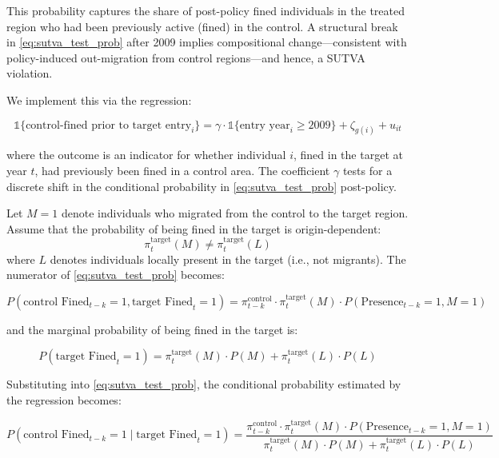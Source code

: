 \documentclass[12pt]{article}
\begin{document}
\noindent This probability captures the share of post-policy fined individuals in the treated region who had been previously active (fined) in the control. A structural break in \eqref{eq:sutva_test_prob} after 2009 implies compositional change—consistent with policy-induced out-migration from control regions—and hence, a SUTVA violation.

\bigskip

We implement this via the regression:

\begin{equation}
\mathbb{1}\{\text{control-fined prior to target entry}_i\}
= \gamma \cdot \mathbb{1}\{\text{entry year}_i \geq 2009\} + \zeta_{g(i)} + u_{it}
\label{eq:sutva_reg}
\end{equation}

\noindent where the outcome is an indicator for whether individual $i$, fined in the target at year $t$, had previously been fined in a control area. The coefficient $\gamma$ tests for a discrete shift in the conditional probability in \eqref{eq:sutva_test_prob} post-policy.

\bigskip

\noindent Let $M = 1$ denote individuals who migrated from the control to the target region. Assume that the probability of being fined in the target is origin-dependent:
\[
\pi^{\text{target}}_t(M) \neq \pi^{\text{target}}_t(L)
\]
where $L$ denotes individuals locally present in the target (i.e., not migrants). The numerator of \eqref{eq:sutva_test_prob} becomes:

\begin{equation}
P(\text{control Fined}_{t-k} = 1, \text{target Fined}_t = 1)
=
\pi^{\text{control}}_{t-k} \cdot \pi^{\text{target}}_t(M) \cdot P(\text{Presence}_{t-k} = 1, M = 1)
\end{equation}

\noindent and the marginal probability of being fined in the target is:

\begin{equation}
P(\text{target Fined}_t = 1)
=
\pi^{\text{target}}_t(M) \cdot P(M) + \pi^{\text{target}}_t(L) \cdot P(L)
\end{equation}

\noindent Substituting into \eqref{eq:sutva_test_prob}, the conditional probability estimated by the regression becomes:

\begin{equation}
P(\text{control Fined}_{t-k} = 1 \mid \text{target Fined}_t = 1)
=
\frac{
\pi^{\text{control}}_{t-k} \cdot \pi^{\text{target}}_t(M) \cdot P(\text{Presence}_{t-k} = 1, M = 1)
}{
\pi^{\text{target}}_t(M) \cdot P(M) + \pi^{\text{target}}_t(L) \cdot P(L)
}
\label{eq:full_hetero_bias}
\end{equation}
\end{document}
